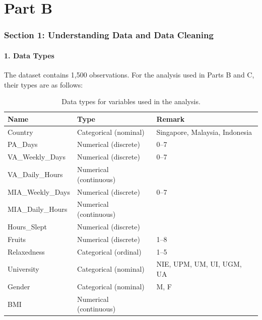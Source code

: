 \part*{Part B}

\section*{Section 1: Understanding Data and Data Cleaning}

\subsection*{1. Data Types}

The dataset contains 1,500 observations. For the analysis used in Parts B and C, their types are as follows:

\begin{table}[h!]
\centering
\begin{tabular}{@{}lll@{}}
\toprule
\textbf{Name} & \textbf{Type} & \textbf{Remark} \\
\midrule
Country         & Categorical (nominal)   & Singapore, Malaysia, Indonesia \\
PA\_Days        & Numerical (discrete)    & 0--7 \\
VA\_Weekly\_Days & Numerical (discrete)   & 0--7 \\
VA\_Daily\_Hours & Numerical (continuous) & \\
MIA\_Weekly\_Days & Numerical (discrete)  & 0--7 \\
MIA\_Daily\_Hours & Numerical (continuous)& \\
Hours\_Slept    & Numerical (discrete)    & \\
Fruits          & Numerical (discrete)    & 1--8 \\
Relaxedness     & Categorical (ordinal)   & 1--5 \\
University      & Categorical (nominal)   & NIE, UPM, UM, UI, UGM, UA \\
Gender          & Categorical (nominal)   & M, F \\
BMI             & Numerical (continuous)  & \\
\bottomrule
\end{tabular}
\caption{Data types for variables used in the analysis.}
\label{tab:datatypes}
\end{table}

